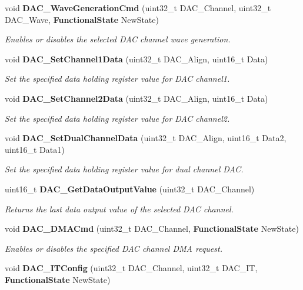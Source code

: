 \begin{DoxyCompactItemize}
void \textbf{ D\+A\+C\+\_\+\+Wave\+Generation\+Cmd} (uint32\+\_\+t D\+A\+C\+\_\+\+Channel, uint32\+\_\+t D\+A\+C\+\_\+\+Wave, \textbf{ Functional\+State} New\+State)
\begin{DoxyCompactList}\small\item\em Enables or disables the selected D\+AC channel wave generation. \end{DoxyCompactList}\item 
void \textbf{ D\+A\+C\+\_\+\+Set\+Channel1\+Data} (uint32\+\_\+t D\+A\+C\+\_\+\+Align, uint16\+\_\+t Data)
\begin{DoxyCompactList}\small\item\em Set the specified data holding register value for D\+AC channel1. \end{DoxyCompactList}\item 
void \textbf{ D\+A\+C\+\_\+\+Set\+Channel2\+Data} (uint32\+\_\+t D\+A\+C\+\_\+\+Align, uint16\+\_\+t Data)
\begin{DoxyCompactList}\small\item\em Set the specified data holding register value for D\+AC channel2. \end{DoxyCompactList}\item 
void \textbf{ D\+A\+C\+\_\+\+Set\+Dual\+Channel\+Data} (uint32\+\_\+t D\+A\+C\+\_\+\+Align, uint16\+\_\+t Data2, uint16\+\_\+t Data1)
\begin{DoxyCompactList}\small\item\em Set the specified data holding register value for dual channel D\+AC. \end{DoxyCompactList}\item 
uint16\+\_\+t \textbf{ D\+A\+C\+\_\+\+Get\+Data\+Output\+Value} (uint32\+\_\+t D\+A\+C\+\_\+\+Channel)
\begin{DoxyCompactList}\small\item\em Returns the last data output value of the selected D\+AC channel. \end{DoxyCompactList}\item 
void \textbf{ D\+A\+C\+\_\+\+D\+M\+A\+Cmd} (uint32\+\_\+t D\+A\+C\+\_\+\+Channel, \textbf{ Functional\+State} New\+State)
\begin{DoxyCompactList}\small\item\em Enables or disables the specified D\+AC channel D\+MA request. \end{DoxyCompactList}\item 
void \textbf{ D\+A\+C\+\_\+\+I\+T\+Config} (uint32\+\_\+t D\+A\+C\+\_\+\+Channel, uint32\+\_\+t D\+A\+C\+\_\+\+IT, \textbf{ Functional\+State} New\+State)

\end{DoxyCompactItemize}
